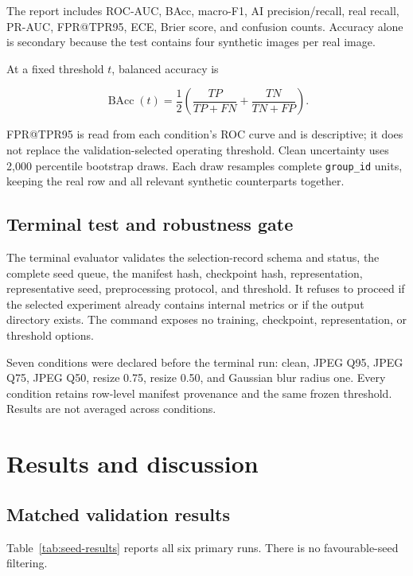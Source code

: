 \documentclass[12pt,a4paper]{article}
\begin{document}
The report includes ROC-AUC, BAcc, macro-F1, AI precision/recall, real recall, PR-AUC,
FPR@TPR95, ECE, Brier score, and confusion counts. Accuracy alone is secondary because the test
contains four synthetic images per real image.

At a fixed threshold $t$, balanced accuracy is

\begin{equation}
  \operatorname{BAcc}(t)=\frac{1}{2}\left(
  \frac{TP}{TP+FN}+\frac{TN}{TN+FP}\right).
\end{equation}

FPR@TPR95 is read from each condition's ROC curve and is descriptive; it does not replace the
validation-selected operating threshold. Clean uncertainty uses 2,000 percentile bootstrap draws.
Each draw resamples complete \texttt{group\_id} units, keeping the real row and all relevant
synthetic counterparts together.

\subsection{Terminal test and robustness gate}

The terminal evaluator validates the selection-record schema and status, the complete seed queue,
the manifest hash, checkpoint hash, representation, representative seed, preprocessing protocol,
and threshold. It refuses to proceed if the selected experiment already contains internal metrics
or if the output directory exists. The command exposes no training, checkpoint, representation, or
threshold options.

Seven conditions were declared before the terminal run: clean, JPEG Q95, JPEG Q75, JPEG Q50,
resize 0.75, resize 0.50, and Gaussian blur radius one. Every condition retains row-level manifest
provenance and the same frozen threshold. Results are not averaged across conditions.

\section{Results and discussion}

\subsection{Matched validation results}

Table~\ref{tab:seed-results} reports all six primary runs. There is no favourable-seed filtering.
\end{document}
